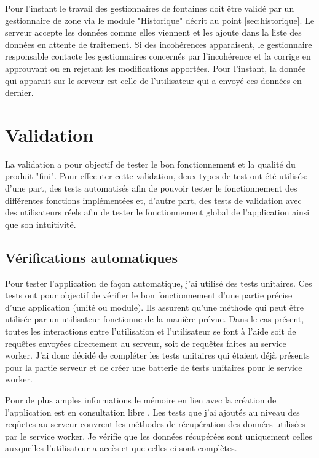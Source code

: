 \documentclass{EPL-master-thesis-covers-FR}
\begin{document}
				          Pour l'instant le travail des gestionnaires de fontaines doit être validé par un gestionnaire de zone via le module "Historique" décrit au point \ref{sec:historique}. Le serveur accepte les données comme elles viennent et les ajoute dans la liste des données en attente de traitement. Si des incohérences apparaisent, le gestionnaire responsable contacte les gestionnaires concernés par l'incohérence et la corrige en approuvant ou en rejetant les modifications apportées. Pour l'instant, la donnée qui apparait sur le serveur est celle de l'utilisateur qui a envoyé ces données en dernier.
			
			
			
			
			
	\chapter{Validation}
		La validation a pour objectif de tester le bon fonctionnement et la qualité du produit "fini". Pour effecuter cette validation, deux types de test ont été utilisés: d'une part, des tests automatisés afin de pouvoir tester le fonctionnement des différentes fonctions implémentées et, d'autre part, des tests  de validation avec des utilisateurs réels afin de tester le fonctionnement global de l'application ainsi que son intuitivité.

		

		\section{Vérifications automatiques}
			Pour tester l'application de façon automatique, j'ai utilisé des tests unitaires. Ces tests ont pour objectif de vérifier le bon fonctionnement d'une partie précise d'une application (unité ou module). Ils assurent qu'une méthode qui peut être utilisée par un utilisateur fonctionne de la manière prévue. Dans le cas présent, toutes les interactions entre l'utilisation et l'utilisateur se font à l'aide soit de requêtes envoyées directement au serveur, soit de requêtes faites au service worker. J'ai donc décidé de compléter les tests unitaires qui étaient déjà présents pour la partie serveur et de créer une batterie de tests unitaires pour le service worker.

			Pour de plus amples informations le mémoire en lien avec la création de l'application est en consultation libre \cite{ref:haitiwater}. Les tests que j'ai ajoutés au niveau des reqûetes au serveur couvrent les méthodes de récupération des données utilisées par le service worker. Je vérifie que les données récupérées sont uniquement celles auxquelles l'utilisateur a accès et que celles-ci sont complètes.
			
\end{document}
